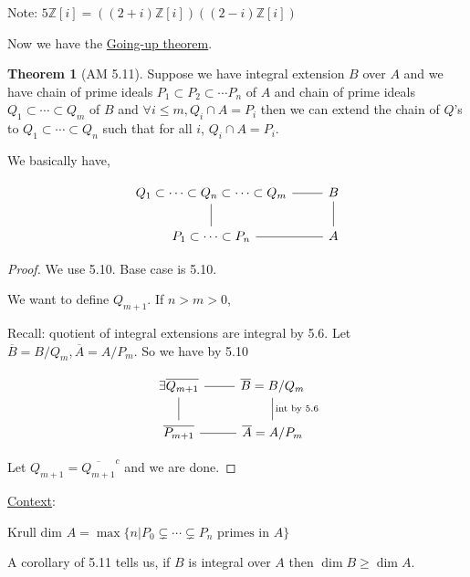 \documentclass{article}
\theoremstyle{definition}
\newtheorem{theorem}{Theorem}
\begin{document}
Note: \(5\mathbb{Z}[i] = ((2+i)\mathbb{Z}[i])((2-i)\mathbb{Z}[i])\) 

Now we have the \underline{Going-up theorem}.

\begin{theorem}
    [AM 5.11]

    Suppose we have integral extension \(B\) over \(A\) and we have chain of prime ideals \(P_1 \subset P_2 \subset \cdots P_n\) of \(A\) and chain of prime ideals \(Q_1 \subset \cdots \subset Q_m\) of \(B\) and \(\forall i \leq m, Q_i\cap A = P_i\) then we can extend the chain of \(Q\)'s to \(Q_1 \subset \cdots \subset Q_n\) such that for all \(i\), \(Q_i\cap A = P_i\).
    
    We basically have,

    \[
        \begin{tikzcd}
            Q_1 \subset \cdots \subset Q_n \subset \cdots \subset Q_m \ar[r, no head] & B \\
            P_1 \subset \cdots \subset P_n \ar[u, no head]\ar[r, no head] & A\ar[u, no head]
        \end{tikzcd}
    \]
\end{theorem}

\begin{proof}
    We use 5.10. Base case is 5.10.

    We want to define \(Q_{m+1}\). If \(n > m > 0\),

    Recall: quotient of integral extensions are integral by 5.6. Let \(\overline{B} = B / Q_m, \overline{A} = A / P_m\). So we have by 5.10
    
    \[
        \begin{tikzcd}
            \exists \overline{Q_{m+1}} \ar[r, no head] & \overline{B} = B / Q_m \\
            \overline{P_{m+1}}  \ar[u, no head] \ar[r, no head] & \overline{A} = A / P_m \ar[u, no head, "\text{int  by 5.6}", swap] 
        \end{tikzcd}
    \]

    Let \(Q_{m+1} = \overline{Q_{m+1}}^c\) and we are done. 

\end{proof}

\underline{Context}:

Krull dim \(A = \max \{ n \vert P_0 \subsetneq \cdots \subsetneq P_n \text{ primes in } A \} \) 

A corollary of 5.11 tells us, if \(B\) is integral over \(A\) then \(\dim B \geq \dim  A\).
\end{document}
